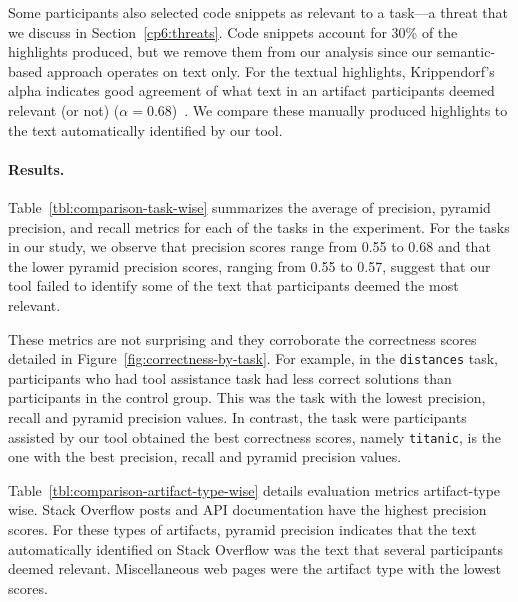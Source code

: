 Some participants also selected code snippets as relevant to a task---a threat that we discuss in Section~\ref{cp6:threats}. 
Code snippets account for 30\% of the highlights produced, but we remove them from our analysis since our semantic-based approach 
operates on text only. For the textual highlights,
Krippendorf's alpha indicates good agreement of what text in an artifact participants deemed relevant (or not) ($\alpha = 0.68$)~\cite{Krippendorff1980, passonneau2006}.
We compare these manually produced highlights to the text automatically identified by our tool.





\paragraph{\textbf{Results.}}




Table~\ref{tbl:comparison-task-wise} summarizes the average of precision, pyramid precision, and recall metrics for each of the tasks in the experiment.
For the tasks in our study, we observe that precision scores range from 0.55 to 0.68 and that 
the lower pyramid precision scores, ranging from 0.55 to 0.57, suggest that our tool failed to identify some of the text that participants deemed the most relevant.




These metrics are not surprising and they corroborate 
the correctness scores detailed in Figure~\ref{fig:correctness-by-task}. For example, 
in the \texttt{distances} task, participants who had tool assistance  task had less correct solutions than participants in the control group.
This was the task with the lowest precision, recall and pyramid precision values. 
In contrast, the task were participants assisted by our tool obtained the best correctness scores, namely \texttt{titanic}, is the one with the best precision, recall and pyramid precision values.








Table~\ref{tbl:comparison-artifact-type-wise} details evaluation metrics artifact-type wise. 
Stack Overflow posts and API documentation have the highest precision scores. For these types of artifacts, pyramid precision indicates that the 
text automatically identified on Stack Overflow was the text that several participants deemed relevant. 
Miscellaneous web pages were the artifact type with the lowest scores. 

